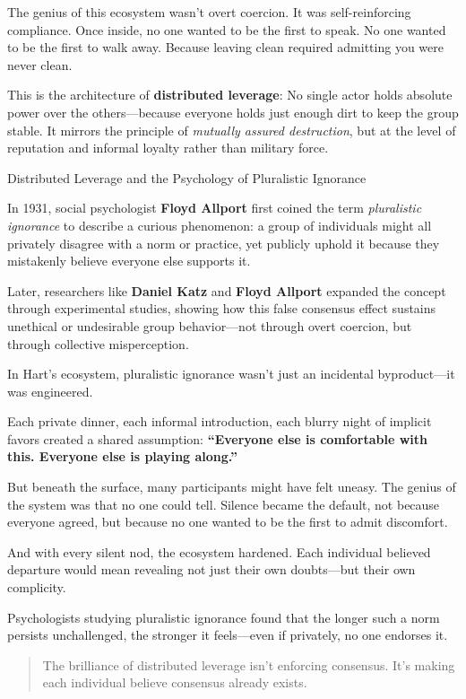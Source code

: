 The genius of this ecosystem wasn’t overt coercion. It was self-reinforcing compliance. Once inside, no one wanted to be the first to speak. No one wanted to be the first to walk away. Because leaving clean required admitting you were never clean.

This is the architecture of \textbf{distributed leverage}:  No single actor holds absolute power over the others—because everyone holds just enough dirt to keep the group stable. It mirrors the principle of \emph{mutually assured destruction}, but at the level of reputation and informal loyalty rather than military force.

\medskip

\begin{PsychologySidebar}{Distributed Leverage and the Psychology of Pluralistic Ignorance}

  In 1931, social psychologist \textbf{Floyd Allport} first coined the term \emph{pluralistic ignorance} to describe a curious phenomenon: a group of individuals might all privately disagree with a norm or practice, yet publicly uphold it because they mistakenly believe everyone else supports it.

  Later, researchers like \textbf{Daniel Katz} and \textbf{Floyd Allport} expanded the concept through experimental studies, showing how this false consensus effect sustains unethical or undesirable group behavior—not through overt coercion, but through collective misperception.

  In Hart’s ecosystem, pluralistic ignorance wasn’t just an incidental byproduct—it was engineered.

  Each private dinner, each informal introduction, each blurry night of implicit favors created a shared assumption: \textbf{“Everyone else is comfortable with this. Everyone else is playing along.”}

  But beneath the surface, many participants might have felt uneasy. The genius of the system was that no one could tell. Silence became the default, not because everyone agreed, but because no one wanted to be the first to admit discomfort.

  \medskip

  And with every silent nod, the ecosystem hardened. Each individual believed departure would mean revealing not just their own doubts—but their own complicity.

  \medskip

  Psychologists studying pluralistic ignorance found that the longer such a norm persists unchallenged, the stronger it feels—even if privately, no one endorses it.

  \begin{quote}
  The brilliance of distributed leverage isn’t enforcing consensus.  It’s making each individual believe consensus already exists.
  \end{quote}

\end{PsychologySidebar}

